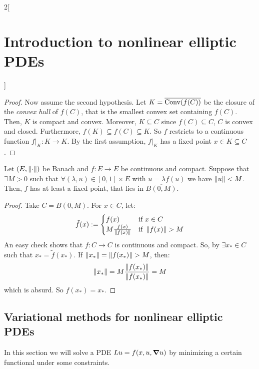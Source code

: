 \documentclass[../../../main_math.tex]{subfiles}
\begin{document}
\begin{multicols}{2}[\section{Introduction to nonlinear elliptic PDEs}]
\begin{proof}
    Now assume the second hypothesis. Let $K=\overline{\mathrm{Conv}(f(C))}$ be the closure of the \emph{convex hull} of $f(C)$, that is the smallest convex set containing $f(C)$. Then, $K$ is compact and convex. Moreover, $K\subseteq C$ since $f(C)\subseteq C$, $C$ is convex and closed. Furthermore, $f(K)\subseteq f(C)\subseteq K$. So $f$ restricts to a continuous function $f|_K:K\to K$. By the first assumption, $f|_K$ has a fixed point $x\in K\subseteq C$.
  \end{proof}
  \begin{theorem}\label{INEPDE:schaefer_fixed_point}
    Let $(E, \left\|\cdot\right\|)$ be Banach and $f:E\to E$ be continuous and compact. Suppose that $\exists M>0$ such that $\forall (\lambda,u)\in [0,1]\times E$ with $u=\lambda f(u)$ we have $\left\|u\right\|<M$. Then, $f$ has at least a fixed point, that lies in $\overline{B(0,M)}$.
  \end{theorem}
  \begin{proof}
    Take $C=\overline{B(0,M)}$. For $x\in C$, let:
    $$
      \tilde{f}(x):=\begin{cases}
        f(x)                      & \text{if }x\in C        \\
        M\frac{f(x)}{\norm{f(x)}} & \text{if }\norm{f(x)}>M
      \end{cases}
    $$
    An easy check shows that $f:C\to C$ is continuous and compact. So, by  $\exists x_*\in C$ such that $x_*=\tilde{f}(x_*)$. If $\norm{x_*}=\norm{f(x_*)}> M$, then:
    $$
      \left\|x_*\right\|=M\frac{\left\|f(x_*)\right\|}{\left\|f(x_*)\right\|}=M
    $$
    which is absurd. So $f(x_*)=x_*$.
  \end{proof}
  \subsection{Variational methods for nonlinear elliptic PDEs}
  In this section we will solve a PDE $Lu=f(x,u,\grad u)$ by minimizing a certain functional under some constraints.

\end{multicols}
\end{document}
